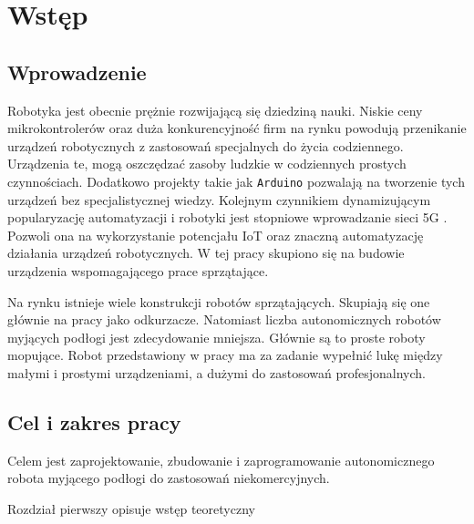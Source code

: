 \chapter{Wstęp}
	\section{Wprowadzenie}
	Robotyka jest obecnie prężnie rozwijającą się dziedziną nauki. Niskie ceny mikrokontrolerów oraz duża konkurencyjność firm na rynku powodują przenikanie urządzeń robotycznych z zastosowań specjalnych do życia codziennego. Urządzenia te, mogą oszczędzać zasoby ludzkie w codziennych prostych czynnościach.  Dodatkowo projekty takie jak \texttt{Arduino} \cite{arduinoFramework} pozwalają na tworzenie tych urządzeń bez specjalistycznej wiedzy. Kolejnym czynnikiem dynamizującym popularyzację automatyzacji i robotyki jest stopniowe wprowadzanie sieci 5G \cite{5ggov}. Pozwoli ona na wykorzystanie potencjału IoT oraz znaczną automatyzację działania urządzeń robotycznych. W tej pracy skupiono się na budowie urządzenia wspomagającego prace sprzątające.
	
	Na rynku istnieje wiele konstrukcji robotów sprzątających. Skupiają się one głównie na pracy jako odkurzacze. Natomiast liczba autonomicznych robotów myjących podłogi jest zdecydowanie mniejsza. Głównie są to proste roboty mopujące. Robot przedstawiony w pracy ma za zadanie wypełnić lukę między małymi i prostymi urządzeniami, a dużymi do zastosowań profesjonalnych.
	
	\section{Cel i zakres pracy}
	Celem jest zaprojektowanie, zbudowanie i zaprogramowanie autonomicznego robota myjącego podłogi do zastosowań niekomercyjnych.
	
	Rozdział pierwszy opisuje wstęp teoretyczny

